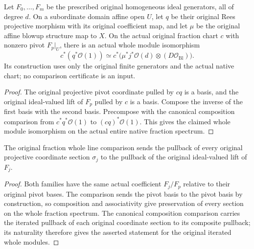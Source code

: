 \begin{definition}
\label{def:whole-original-fraction-line-comparison}
\leanok
{}
Let $F_0,\ldots,F_m$ be the prescribed original homogeneous ideal generators, all of degree $d$. On a subordinate domain affine open $U$, let $q$ be their original Rees projective morphism with its original coefficient map, and let $\mu$ be the original affine blowup structure map to $X$. On the actual original fraction chart $c$ with nonzero pivot $F_p|_U$, there is an actual whole module isomorphism
\[
 c^*(q^*\mathcal O(1))\simeq
 c^*\bigl(\mu^*j^*\mathcal O(d)\otimes(D\mathcal O_{\mathrm{Bl}})\bigr).
\]
Its construction uses only the original finite generators and the actual native chart; no comparison certificate is an input.
\end{definition}
\begin{proof}
The original projective pivot coordinate pulled by $cq$ is a basis, and the original ideal-valued lift of $F_p$ pulled by $c$ is a basis. Compose the inverse of the first basis with the second basis. Precompose with the canonical composition comparison from $c^*q^*\mathcal O(1)$ to $(cq)^*\mathcal O(1)$. This gives the claimed whole module isomorphism on the actual entire native fraction spectrum.
\end{proof}

\begin{proposition}
\label{prop:whole-original-fraction-line-sections}
\leanok
{}
The original fraction whole line comparison sends the pullback of every original projective coordinate section $\sigma_j$ to the pullback of the original ideal-valued lift of $F_j$.
\end{proposition}
\begin{proof}
Both families have the same actual coefficient $F_j/F_p$ relative to their original pivot bases. The comparison sends the pivot basis to the pivot basis by construction, so composition and associativity give preservation of every section on the whole fraction spectrum. The canonical composition comparison carries the iterated pullback of each original coordinate section to its composite pullback; its naturality therefore gives the asserted statement for the original iterated whole modules.
\end{proof}
